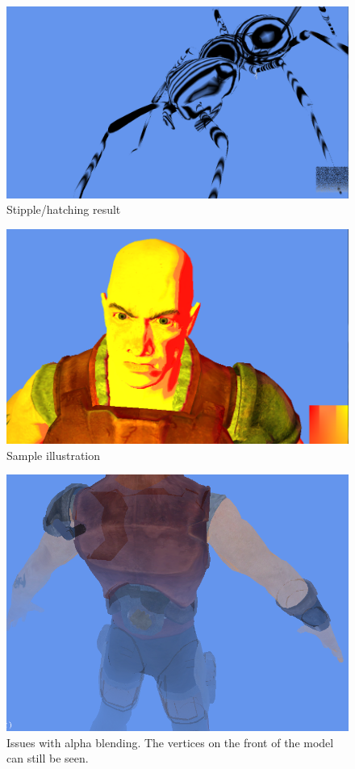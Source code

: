 \documentclass[annual]{acmsiggraph}
\begin{document}
\begin{figure}[h]
	\centering
	\includegraphics[width=5.5in]{images/stipple-hatch-result2}
	\caption{Stipple/hatching result}
	\label{fig:stippleHatch2}
\end{figure}

\begin{figure}[h]
  \centering
  \includegraphics[width=5.5in]{images/test}
  \caption{Sample illustration}
\end{figure}

\begin{figure}[h]
 \centering
 \includegraphics[width=5.5in]{images/alpha_issues}
 \caption{Issues with alpha blending. The vertices on the front of the model can still be seen.}
 \label{fig:alpha_issue}
\end{figure}
\end{document}
